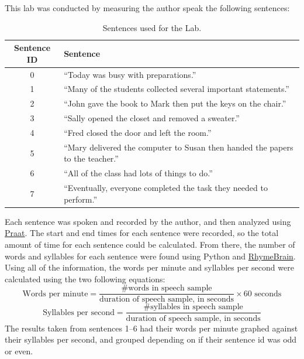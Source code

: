 \documentclass[lab=1,title={Speaking rate},turnin=false]{com310lab}
\newcommand{\wpm}{\mbox{Words per minute} = \frac{\mbox{\# words in speech sample}}{\mbox{duration of speech sample, in seconds}} \times 60 \mbox{ seconds}}
\newcommand{\sps}{\mbox{Syllables per second} = \frac{\mbox{\# syllables in speech sample}}{\mbox{duration of speech sample, in seconds}}}
\begin{document}
\begin{method}%
	This lab was conducted by measuring the author speak the following sentences:
	\begin{table}[H]
	    \centering
		\caption{Sentences used for the Lab.}
		\label{tab:sentences}
		\begin{tabular}{|c|l|}
			\hline
			{\centering\textbf{Sentence ID}} & {\centering\textbf{Sentence}}\\
			\hline
			0 & ``Today was busy with preparations.''\\
			1 & ``Many of the students collected several important statements.''\\
			2 & ``John gave the book to Mark then put the keys on the chair.''\\
			3 & ``Sally opened the closet and removed a sweater.''\\
			4 & ``Fred closed the door and left the room.''\\
			5 & ``Mary delivered the computer to Susan then handed the papers to the teacher.''\\
			6 & ``All of the class had lots of things to do.''\\
			7 & ``Eventually, everyone completed the task they needed to perform.''\\
			\hline
		\end{tabular}
	\end{table}
	Each sentence was spoken and recorded by the author, and then analyzed using \href{https://www.fon.hum.uva.nl/praat/}{Praat}.
	The start and end times for each sentence were recorded, so the total amount of time for each sentence could be calculated.
	From there, the number of words and syllables for each sentence were found using Python and \href{https://rhymebrain.com/api.html}{RhymeBrain}.
	Using all of the information, the words per minute and syllables per second were calculated using the two following equations:
	\begin{equation}\wpm\label{eq:wpm}\end{equation}
	\begin{equation}\sps\label{eq:sps}\end{equation}
	The results taken from sentences 1--6 had their words per minute graphed against their syllables per second, and grouped depending on if their sentence id was odd or even.
\end{method}
\end{document}
